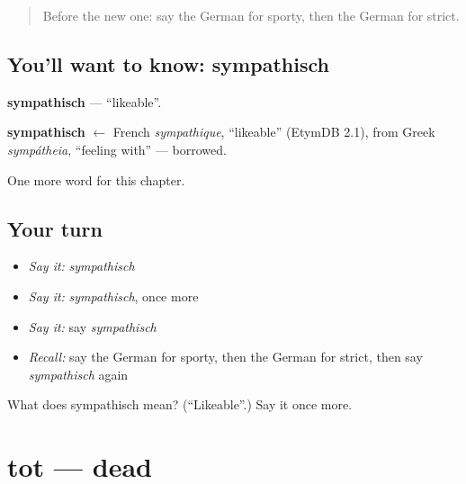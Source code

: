\label{lesson:GE-C222-sympathisch}



\begin{quote}
Before the new one: say the German for sporty, then the German for strict.
\end{quote}

\subsection*{You'll want to know: sympathisch}
\textbf{sympathisch} — \textquotedblleft{}likeable\textquotedblright{}.

\begin{cousinweb}
\textbf{sympathisch} $\leftarrow$ French \emph{sympathique}, \textquotedblleft{}likeable\textquotedblright{} (EtymDB 2.1), from Greek \emph{sympátheia}, \textquotedblleft{}feeling with\textquotedblright{} — borrowed.
\end{cousinweb}

\begin{grammarlens}[title={What you've built}]
One more word for this chapter.
\end{grammarlens}

\subsection*{Your turn}
\begin{itemize}
\raggedright
  \item \emph{Say it:} \emph{sympathisch}
  \item \emph{Say it:} \emph{sympathisch}, once more
  \item \emph{Say it:} say \emph{sympathisch}
  \item \emph{Recall:} say the German for sporty, then the German for strict, then say \emph{sympathisch} again
\end{itemize}

\begin{tcolorbox}[breakable,colback=teal!4,colframe=teal!35!black,title={Before you move on}]
What does sympathisch mean? (\textquotedblleft{}Likeable\textquotedblright{}.) Say it once more.
\end{tcolorbox}
\section[tot]{tot — dead}

\label{lesson:GE-C222-tot}



